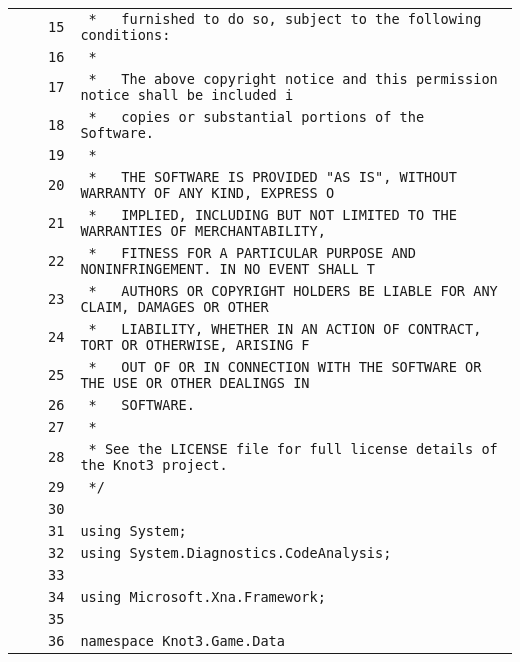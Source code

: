 \documentclass[a4paper,10pt]{article}
\begin{document}
\begin{longtable}[l]{lrrl}
\cellcolor{gray} &  & \verb~15~ & \verb~ *   furnished to do so, subject to the following conditions:~\\
\cellcolor{gray} &  & \verb~16~ & \verb~ *~\\
\cellcolor{gray} &  & \verb~17~ & \verb~ *   The above copyright notice and this permission notice shall be included i~\\
\cellcolor{gray} &  & \verb~18~ & \verb~ *   copies or substantial portions of the Software.~\\
\cellcolor{gray} &  & \verb~19~ & \verb~ *~\\
\cellcolor{gray} &  & \verb~20~ & \verb~ *   THE SOFTWARE IS PROVIDED "AS IS", WITHOUT WARRANTY OF ANY KIND, EXPRESS O~\\
\cellcolor{gray} &  & \verb~21~ & \verb~ *   IMPLIED, INCLUDING BUT NOT LIMITED TO THE WARRANTIES OF MERCHANTABILITY,~\\
\cellcolor{gray} &  & \verb~22~ & \verb~ *   FITNESS FOR A PARTICULAR PURPOSE AND NONINFRINGEMENT. IN NO EVENT SHALL T~\\
\cellcolor{gray} &  & \verb~23~ & \verb~ *   AUTHORS OR COPYRIGHT HOLDERS BE LIABLE FOR ANY CLAIM, DAMAGES OR OTHER~\\
\cellcolor{gray} &  & \verb~24~ & \verb~ *   LIABILITY, WHETHER IN AN ACTION OF CONTRACT, TORT OR OTHERWISE, ARISING F~\\
\cellcolor{gray} &  & \verb~25~ & \verb~ *   OUT OF OR IN CONNECTION WITH THE SOFTWARE OR THE USE OR OTHER DEALINGS IN~\\
\cellcolor{gray} &  & \verb~26~ & \verb~ *   SOFTWARE.~\\
\cellcolor{gray} &  & \verb~27~ & \verb~ *~\\
\cellcolor{gray} &  & \verb~28~ & \verb~ * See the LICENSE file for full license details of the Knot3 project.~\\
\cellcolor{gray} &  & \verb~29~ & \verb~ */~\\
\cellcolor{gray} &  & \verb~30~ & \verb~~\\
\cellcolor{gray} &  & \verb~31~ & \verb~using System;~\\
\cellcolor{gray} &  & \verb~32~ & \verb~using System.Diagnostics.CodeAnalysis;~\\
\cellcolor{gray} &  & \verb~33~ & \verb~~\\
\cellcolor{gray} &  & \verb~34~ & \verb~using Microsoft.Xna.Framework;~\\
\cellcolor{gray} &  & \verb~35~ & \verb~~\\
\cellcolor{gray} &  & \verb~36~ & \verb~namespace Knot3.Game.Data~\\

\end{longtable}
\end{document}
